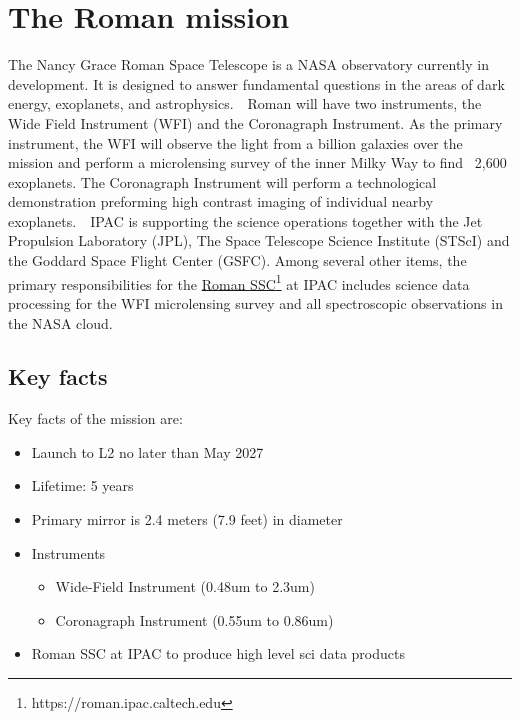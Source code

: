 \documentclass[11pt,twoside]{article}
\begin{document}


\section{The Roman mission}

The Nancy Grace Roman Space Telescope is a NASA observatory currently in development. It is designed to answer fundamental questions in the areas of dark energy, exoplanets, and astrophysics.  Roman will have two instruments, the Wide Field Instrument (WFI) and the Coronagraph Instrument. As the primary instrument, the WFI will observe the light from a billion galaxies over the mission and perform a microlensing survey of the inner Milky Way to find ~2,600 exoplanets. The Coronagraph Instrument will perform a technological demonstration preforming high contrast imaging of individual nearby exoplanets.  IPAC is supporting the science operations together with the Jet Propulsion Laboratory (JPL), The Space Telescope Science Institute (STScI) and the Goddard Space Flight Center (GSFC). Among several other items, the primary responsibilities for the \href{https://roman.ipac.caltech.edu}{Roman SSC\footnote{https://roman.ipac.caltech.edu}} at IPAC includes science data processing for the WFI microlensing survey and all spectroscopic observations in the NASA cloud.


\subsection{Key facts}

Key facts of the mission are:
\begin{itemize}
  \item Launch to L2 no later than May 2027
  \item Lifetime: 5 years
  \item Primary mirror is 2.4 meters (7.9 feet) in diameter
  \item Instruments
    \begin{itemize}
        \item Wide-Field Instrument (0.48um to 2.3um)
        \item Coronagraph Instrument (0.55um to 0.86um)
    \end{itemize}
  \item Roman SSC at IPAC to produce high level sci data products
\end{itemize}
\end{document}
